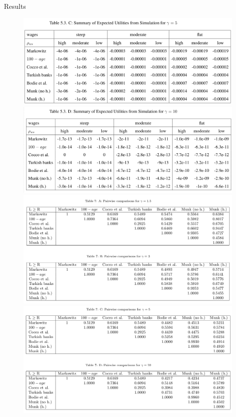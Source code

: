 \documentclass{beamer}
\begin{document}
\begin{frame}[allowframebreaks]{Results}
\begin{itemize}
\begin{figure}[H]
		\includegraphics[scale=0.2]{figs/util5.png}
		\includegraphics[scale=0.2]{figs/util10.png}
		\includegraphics[scale=0.25]{figs/pair153.png}
		\includegraphics[scale=0.25]{figs/pair510.png}
	\end{figure}


\end{itemize}
\end{frame}
\end{document}
